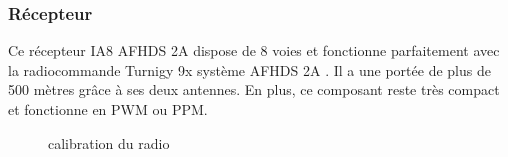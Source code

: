 	\subsubsection{Récepteur }
	Ce récepteur IA8 AFHDS 2A dispose de 8 voies et fonctionne parfaitement avec la radiocommande Turnigy 9x système AFHDS 2A \cite{Hobbyking}. Il a une portée de plus de 500 mètres  grâce à ses deux antennes. En plus, ce composant reste très compact et fonctionne en PWM ou PPM.
	\begin{figure} [H]
		\begin{center}
			\centering
		\end{center}
		\caption{calibration du radio}
	\end{figure}
